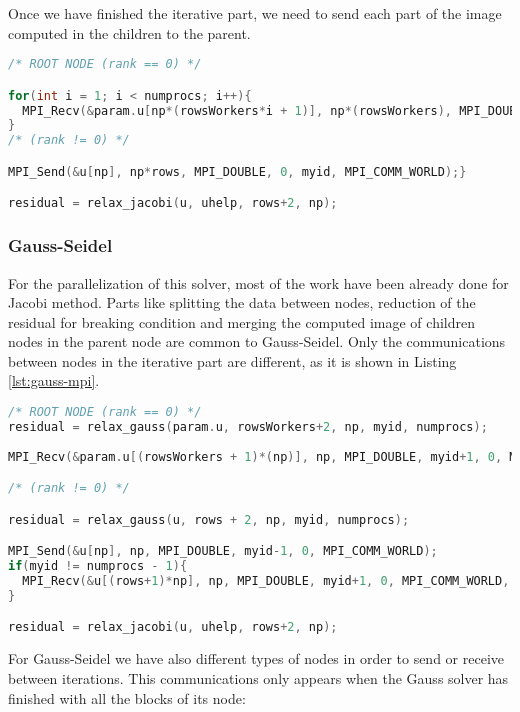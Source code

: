 \documentclass[a4paper, 10pt]{article}
\begin{document}
Once we have finished the iterative part, we need to send each part of the image computed in the children to the parent.

\begin{lstlisting}[language=c, caption={Communication of the computed image to the parent}]
/* ROOT NODE (rank == 0) */

for(int i = 1; i < numprocs; i++){
  MPI_Recv(&param.u[np*(rowsWorkers*i + 1)], np*(rowsWorkers), MPI_DOUBLE, i, i, MPI_COMM_WORLD, &status);
}
/* (rank != 0) */

MPI_Send(&u[np], np*rows, MPI_DOUBLE, 0, myid, MPI_COMM_WORLD);}

residual = relax_jacobi(u, uhelp, rows+2, np);
\end{lstlisting}


\subsubsection{Gauss-Seidel}

For the parallelization of this solver, most of the work have been already done for Jacobi method. Parts like splitting the data between nodes, reduction of the residual for breaking condition and merging the computed image of children nodes in the parent node are common to Gauss-Seidel. Only the communications between nodes in the iterative part are different, as it is shown in Listing \ref{lst:gauss-mpi}.

\begin{lstlisting}[language=c, caption={Communications between nodes Gauss-Seidel}, label={lst:gauss-mpi}]
/* ROOT NODE (rank == 0) */
residual = relax_gauss(param.u, rowsWorkers+2, np, myid, numprocs);
 
MPI_Recv(&param.u[(rowsWorkers + 1)*(np)], np, MPI_DOUBLE, myid+1, 0, MPI_COMM_WORLD, &status);

/* (rank != 0) */

residual = relax_gauss(u, rows + 2, np, myid, numprocs);   

MPI_Send(&u[np], np, MPI_DOUBLE, myid-1, 0, MPI_COMM_WORLD);
if(myid != numprocs - 1){
  MPI_Recv(&u[(rows+1)*np], np, MPI_DOUBLE, myid+1, 0, MPI_COMM_WORLD, &status);
}

residual = relax_jacobi(u, uhelp, rows+2, np);
\end{lstlisting}

For Gauss-Seidel we have also different types of nodes in order to send or receive between iterations. This communications only appears when the Gauss solver has finished with all the blocks of its node:
\end{document}
